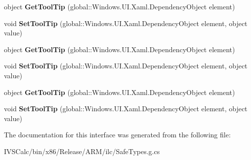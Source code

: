 \begin{DoxyCompactItemize}
object {\bfseries Get\+Tool\+Tip} (global\+::\+Windows.\+U\+I.\+Xaml.\+Dependency\+Object element)
\item 
\mbox{\label{interface_windows_1_1_u_i_1_1_xaml_1_1_controls_1_1_i_tool_tip_service_statics_a4769ab069237aeb3fbe8be1f8f0b29f3}} 
void {\bfseries Set\+Tool\+Tip} (global\+::\+Windows.\+U\+I.\+Xaml.\+Dependency\+Object element, object value)
\item 
\mbox{\label{interface_windows_1_1_u_i_1_1_xaml_1_1_controls_1_1_i_tool_tip_service_statics_a1e203699b88ee755f3d5a6872240a045}} 
object {\bfseries Get\+Tool\+Tip} (global\+::\+Windows.\+U\+I.\+Xaml.\+Dependency\+Object element)
\item 
\mbox{\label{interface_windows_1_1_u_i_1_1_xaml_1_1_controls_1_1_i_tool_tip_service_statics_a4769ab069237aeb3fbe8be1f8f0b29f3}} 
void {\bfseries Set\+Tool\+Tip} (global\+::\+Windows.\+U\+I.\+Xaml.\+Dependency\+Object element, object value)
\item 
\mbox{\label{interface_windows_1_1_u_i_1_1_xaml_1_1_controls_1_1_i_tool_tip_service_statics_a1e203699b88ee755f3d5a6872240a045}} 
object {\bfseries Get\+Tool\+Tip} (global\+::\+Windows.\+U\+I.\+Xaml.\+Dependency\+Object element)
\item 
\mbox{\label{interface_windows_1_1_u_i_1_1_xaml_1_1_controls_1_1_i_tool_tip_service_statics_a4769ab069237aeb3fbe8be1f8f0b29f3}} 
void {\bfseries Set\+Tool\+Tip} (global\+::\+Windows.\+U\+I.\+Xaml.\+Dependency\+Object element, object value)
\end{DoxyCompactItemize}


The documentation for this interface was generated from the following file\+:\begin{DoxyCompactItemize}
\item 
I\+V\+S\+Calc/bin/x86/\+Release/\+A\+R\+M/ilc/Safe\+Types.\+g.\+cs\end{DoxyCompactItemize}
